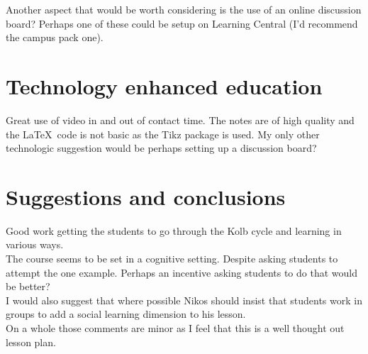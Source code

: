 \documentclass[a4paper,12pt]{article}
\begin{document}
Another aspect that would be worth considering is the use of an online discussion board? Perhaps one of these could be setup on Learning Central (I'd recommend the campus pack one).

\section{Technology enhanced education}

Great use of video in and out of contact time. The notes are of high quality and the \LaTeX\ code is not basic as the Tikz package is used. My only other technologic suggestion would be perhaps setting up a discussion board?


\section{Suggestions and conclusions}

Good work getting the students to go through the Kolb cycle and learning in various ways.\\

The course seems to be set in a cognitive setting. Despite asking students to attempt the one example. Perhaps an incentive asking students to do that would be better?\\

I would also suggest that where possible Nikos should insist that students work in groups to add a social learning dimension to his lesson.\\

On a whole those comments are minor as I feel that this is a well thought out lesson plan.\\
\end{document}
